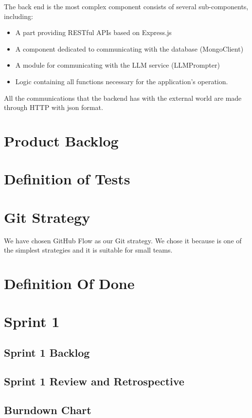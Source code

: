 \documentclass{article}
\begin{document}
The back end is the most complex component consists of several sub-components, including:
\begin{itemize}
    \item A part providing RESTful APIs based on Express.js
    \item A component dedicated to communicating with the database (MongoClient)
    \item A module for communicating with the LLM service (LLMPrompter)
    \item Logic containing all functions necessary for the application's operation.
\end{itemize}
All the communications that the backend has with the external world are made through HTTP with json format.

\section{Product Backlog}

\section{Definition of Tests}

\section{Git Strategy}

We have chosen GitHub Flow as our Git strategy.
We chose it because is one of the simplest strategies and it is suitable for small teams. 

\section{Definition Of Done}

\section{Sprint 1}

\subsection{Sprint 1 Backlog}

\subsection{Sprint 1 Review and Retrospective}

\subsection{Burndown Chart}
\end{document}
